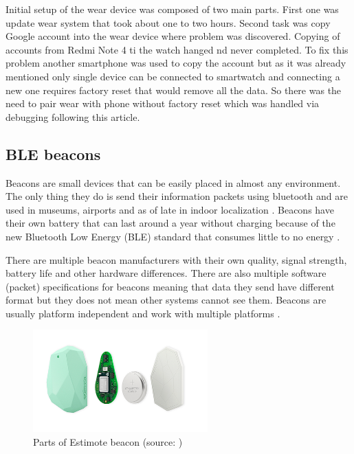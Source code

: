 Initial setup of the wear device was composed of two main parts. First one was update wear system that took about one to two hours. Second task was copy Google account into the wear device where problem was discovered. Copying of accounts from Redmi Note 4 ti the watch hanged nd never completed. To fix this problem another smartphone was used to copy the account but as it was already mentioned only single device can be connected to smartwatch and connecting a new one requires factory reset that would remove all the data. So there was the need to pair wear with phone without factory reset which was handled via debugging following this \cite{HtPAWW} article.


\subsection{BLE beacons}\label{subsec:BLEBeacons}
Beacons are small devices that can be easily placed in almost any environment. The only thing they do is send their information packets using bluetooth and are used in museums, airports and as of late in indoor localization \cite{10TABB}. Beacons have their own battery that can last around a year without charging because of the new Bluetooth Low Energy (BLE) standard that consumes little to no energy \cite{IPSBOBLE}. 

There are multiple beacon manufacturers with their own quality, signal strength, battery life and other hardware differences. There are also multiple software (packet) specifications for beacons meaning that data they send have different format but they does not mean other systems cannot see them. Beacons are usually platform independent and work with multiple platforms \cite{IPSBOBLE, 10TABB}.

\begin{figure}[H]
	\begin{centering}
		\includegraphics[width=0.6\textwidth]{img/estimote_beacon}
		\par\end{centering}
	\caption{Parts of Estimote beacon (source: \cite{RMPFEB})\label{fig:PartsOfEstimoteBeacon}}
	\label{fig10}
\end{figure}


